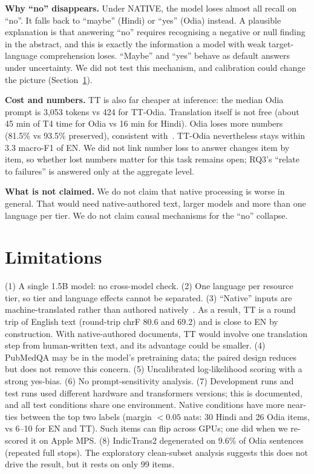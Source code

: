 \documentclass[acmsmall,nonacm]{acmart}
\begin{document}
\textbf{Why ``no'' disappears.} Under NATIVE, the model loses almost all recall on ``no''. It falls back to ``maybe'' (Hindi) or ``yes'' (Odia) instead. A plausible explanation is that answering ``no'' requires recognising a negative or null finding in the abstract, and this is exactly the information a model with weak target-language comprehension loses. ``Maybe'' and ``yes'' behave as default answers under uncertainty. We did not test this mechanism, and calibration could change the picture (Section~\ref{sec:limits}).

\textbf{Cost and numbers.} TT is also far cheaper at inference: the median Odia prompt is 3,053 tokens vs 424 for TT-Odia. Translation itself is not free (about 45 min of T4 time for Odia vs 16 min for Hindi). Odia loses more numbers (81.5\% vs 93.5\% preserved), consistent with~\cite{agrawal2024translation}. TT-Odia nevertheless stays within 3.3 macro-F1 of EN. We did not link number loss to answer changes item by item, so whether lost numbers matter for this task remains open; RQ3's ``relate to failures'' is answered only at the aggregate level.

\textbf{What is not claimed.} We do not claim that native processing is worse in general. That would need native-authored text, larger models and more than one language per tier. We do not claim causal mechanisms for the ``no'' collapse.

\section{Limitations}
\label{sec:limits}
(1) A single 1.5B model: no cross-model check. (2) One language per resource tier, so tier and language effects cannot be separated. (3) ``Native'' inputs are machine-translated rather than authored natively~\cite{huang2025benchmax}. As a result, TT is a round trip of English text (round-trip chrF 80.6 and 69.2) and is close to EN by construction. With native-authored documents, TT would involve one translation step from human-written text, and its advantage could be smaller. (4) PubMedQA may be in the model's pretraining data; the paired design reduces but does not remove this concern. (5) Uncalibrated log-likelihood scoring with a strong yes-bias. (6) No prompt-sensitivity analysis. (7) Development runs and test runs used different hardware and transformers versions; this is documented, and all test conditions share one environment. Native conditions have more near-ties between the top two labels (margin $<0.05$ nats: 30 Hindi and 26 Odia items, vs 6--10 for EN and TT). Such items can flip across GPUs; one did when we re-scored it on Apple MPS. (8) IndicTrans2 degenerated on 9.6\% of Odia sentences (repeated full stops). The exploratory clean-subset analysis suggests this does not drive the result, but it rests on only 99 items.
\end{document}
